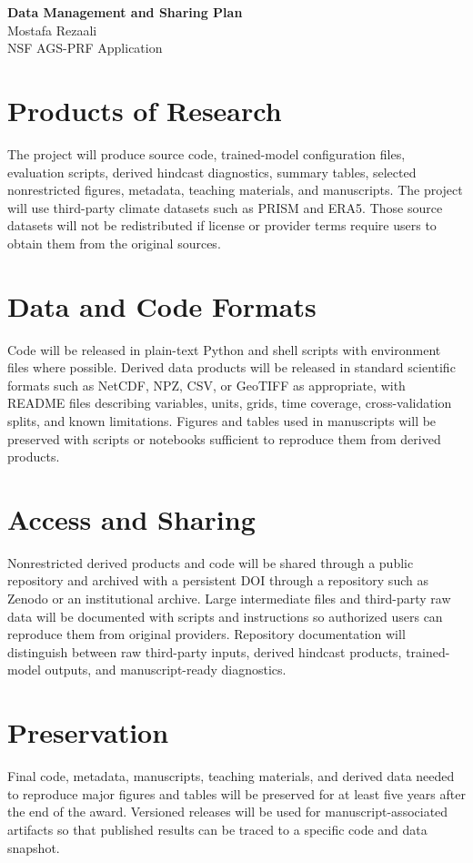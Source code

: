 \documentclass[11pt,letterpaper]{article}
\begin{document}
\begin{center}
{\Large\bfseries Data Management and Sharing Plan}\\[0.05in]
{\normalsize Mostafa Rezaali}\\
{\normalsize NSF AGS-PRF Application}
\end{center}
\vspace{-0.08in}
\section*{Products of Research}
The project will produce source code, trained-model configuration files, evaluation scripts, derived hindcast diagnostics, summary tables, selected nonrestricted figures, metadata, teaching materials, and manuscripts. The project will use third-party climate datasets such as PRISM and ERA5. Those source datasets will not be redistributed if license or provider terms require users to obtain them from the original sources.

\section*{Data and Code Formats}
Code will be released in plain-text Python and shell scripts with environment files where possible. Derived data products will be released in standard scientific formats such as NetCDF, NPZ, CSV, or GeoTIFF as appropriate, with README files describing variables, units, grids, time coverage, cross-validation splits, and known limitations. Figures and tables used in manuscripts will be preserved with scripts or notebooks sufficient to reproduce them from derived products.

\section*{Access and Sharing}
Nonrestricted derived products and code will be shared through a public repository and archived with a persistent DOI through a repository such as Zenodo or an institutional archive. Large intermediate files and third-party raw data will be documented with scripts and instructions so authorized users can reproduce them from original providers. Repository documentation will distinguish between raw third-party inputs, derived hindcast products, trained-model outputs, and manuscript-ready diagnostics.

\section*{Preservation}
Final code, metadata, manuscripts, teaching materials, and derived data needed to reproduce major figures and tables will be preserved for at least five years after the end of the award. Versioned releases will be used for manuscript-associated artifacts so that published results can be traced to a specific code and data snapshot.
\end{document}
